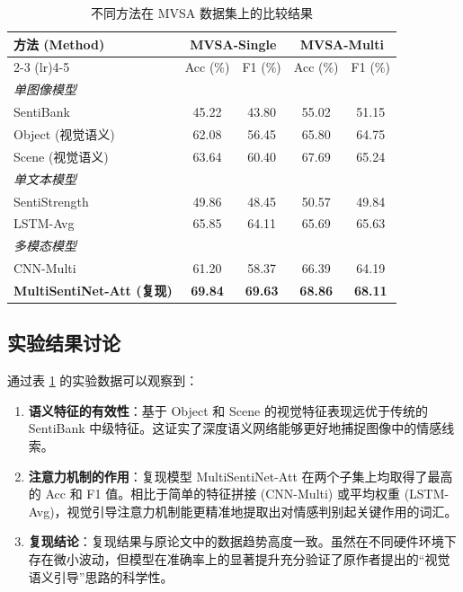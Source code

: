 \documentclass[conference, 12pt,onecolumn]{IEEEtran}
\begin{document}
\begin{table}[htbp]
\centering
\caption{不同方法在 MVSA 数据集上的比较结果}
\label{tab:results}
\begin{tabular}{lcccc}
\toprule
\textbf{方法 (Method)} & \multicolumn{2}{c}{\textbf{MVSA-Single}} & \multicolumn{2}{c}{\textbf{MVSA-Multi}} \\
\cmidrule(lr){2-3} \cmidrule(lr){4-5}
& Acc (\%) & F1 (\%) & Acc (\%) & F1 (\%) \\
\midrule
\textit{单图像模型} & & & & \\
SentiBank & 45.22 & 43.80 & 55.02 & 51.15 \\
Object (视觉语义) & 62.08 & 56.45 & 65.80 & 64.75 \\
Scene (视觉语义) & 63.64 & 60.40 & 67.69 & 65.24 \\
\midrule
\textit{单文本模型} & & & & \\
SentiStrength & 49.86 & 48.45 & 50.57 & 49.84 \\
LSTM-Avg & 65.85 & 64.11 & 65.69 & 65.63 \\
\midrule
\textit{多模态模型} & & & & \\
CNN-Multi & 61.20 & 58.37 & 66.39 & 64.19 \\
\textbf{MultiSentiNet-Att (复现)} & \textbf{69.84} & \textbf{69.63} & \textbf{68.86} & \textbf{68.11} \\
\bottomrule
\end{tabular}
\end{table}

\subsection{实验结果讨论}
通过表 \ref{tab:results} 的实验数据可以观察到：
\begin{enumerate}
    \item \textbf{语义特征的有效性}：基于 Object 和 Scene 的视觉特征表现远优于传统的 SentiBank 中级特征。这证实了深度语义网络能够更好地捕捉图像中的情感线索。
    \item \textbf{注意力机制的作用}：复现模型 MultiSentiNet-Att 在两个子集上均取得了最高的 Acc 和 F1 值。相比于简单的特征拼接 (CNN-Multi) 或平均权重 (LSTM-Avg)，视觉引导注意力机制能更精准地提取出对情感判别起关键作用的词汇。
    \item \textbf{复现结论}：复现结果与原论文中的数据趋势高度一致。虽然在不同硬件环境下存在微小波动，但模型在准确率上的显著提升充分验证了原作者提出的“视觉语义引导”思路的科学性。
\end{enumerate}
\end{document}
